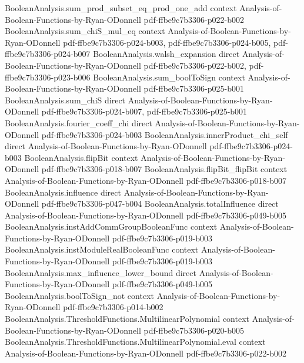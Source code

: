 \begin{theorem}
  {BooleanAnalysis.sum_prod_subset_eq_prod_one_add}
  {context}
  {Analysis-of-Boolean-Functions-by-Ryan-ODonnell}
  {pdf-ffbe9c7b3306-p022-b002}
\proofstep
  {BooleanAnalysis.sum_chiS_mul_eq}
  {context}
  {Analysis-of-Boolean-Functions-by-Ryan-ODonnell}
  {pdf-ffbe9c7b3306-p024-b003,
    pdf-ffbe9c7b3306-p024-b005,
    pdf-ffbe9c7b3306-p024-b007}
\proofstep
  {BooleanAnalysis.walsh_expansion}
  {direct}
  {Analysis-of-Boolean-Functions-by-Ryan-ODonnell}
  {pdf-ffbe9c7b3306-p022-b002,
    pdf-ffbe9c7b3306-p023-b006}
\proofstep
  {BooleanAnalysis.sum_boolToSign}
  {context}
  {Analysis-of-Boolean-Functions-by-Ryan-ODonnell}
  {pdf-ffbe9c7b3306-p025-b001}
\proofstep
  {BooleanAnalysis.sum_chiS}
  {direct}
  {Analysis-of-Boolean-Functions-by-Ryan-ODonnell}
  {pdf-ffbe9c7b3306-p024-b007,
    pdf-ffbe9c7b3306-p025-b001}
\proofstep
  {BooleanAnalysis.fourier_coeff_chi}
  {direct}
  {Analysis-of-Boolean-Functions-by-Ryan-ODonnell}
  {pdf-ffbe9c7b3306-p024-b003}
\proofstep
  {BooleanAnalysis.innerProduct_chi_self}
  {direct}
  {Analysis-of-Boolean-Functions-by-Ryan-ODonnell}
  {pdf-ffbe9c7b3306-p024-b003}
\proofstep
  {BooleanAnalysis.flipBit}
  {context}
  {Analysis-of-Boolean-Functions-by-Ryan-ODonnell}
  {pdf-ffbe9c7b3306-p018-b007}
\proofstep
  {BooleanAnalysis.flipBit_flipBit}
  {context}
  {Analysis-of-Boolean-Functions-by-Ryan-ODonnell}
  {pdf-ffbe9c7b3306-p018-b007}
\proofstep
  {BooleanAnalysis.influence}
  {direct}
  {Analysis-of-Boolean-Functions-by-Ryan-ODonnell}
  {pdf-ffbe9c7b3306-p047-b004}
\proofstep
  {BooleanAnalysis.totalInfluence}
  {direct}
  {Analysis-of-Boolean-Functions-by-Ryan-ODonnell}
  {pdf-ffbe9c7b3306-p049-b005}
\proofstep
  {BooleanAnalysis.instAddCommGroupBooleanFunc}
  {context}
  {Analysis-of-Boolean-Functions-by-Ryan-ODonnell}
  {pdf-ffbe9c7b3306-p019-b003}
\proofstep
  {BooleanAnalysis.instModuleRealBooleanFunc}
  {context}
  {Analysis-of-Boolean-Functions-by-Ryan-ODonnell}
  {pdf-ffbe9c7b3306-p019-b003}
\proofstep
  {BooleanAnalysis.max_influence_lower_bound}
  {direct}
  {Analysis-of-Boolean-Functions-by-Ryan-ODonnell}
  {pdf-ffbe9c7b3306-p049-b005}
\proofstep
  {BooleanAnalysis.boolToSign_not}
  {context}
  {Analysis-of-Boolean-Functions-by-Ryan-ODonnell}
  {pdf-ffbe9c7b3306-p014-b002}
\proofstep
  {BooleanAnalysis.ThresholdFunctions.MultilinearPolynomial}
  {context}
  {Analysis-of-Boolean-Functions-by-Ryan-ODonnell}
  {pdf-ffbe9c7b3306-p020-b005}
\proofstep
  {BooleanAnalysis.ThresholdFunctions.MultilinearPolynomial.eval}
  {context}
  {Analysis-of-Boolean-Functions-by-Ryan-ODonnell}
  {pdf-ffbe9c7b3306-p022-b002}
\proofstep

\end{theorem}
